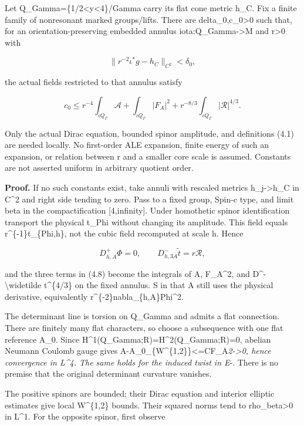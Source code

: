 \documentclass[
  10pt,
]{article}
\begin{document}
Let Q\_Gamma=\{1/2\textless\textbar y\textbar\textless4\}/Gamma carry
its flat cone metric h\_C. Fix a finite family of nonresonant marked
groups/lifts. There are delta\_0,c\_0\textgreater0 such that, for an
orientation-preserving embedded annulus iota:Q\_Gamma-\textgreater M and
r\textgreater0 with

\[
 \|r^{-2}\iota^*g-h_C\|_{C^2}<\delta_0,
\]

the actual fields restricted to that annulus satisfy

\[
 \boxed{c_0\le r^{-4}\int_{\iota Q_\Gamma}\mathcal A
          +\int_{\iota Q_\Gamma}|F_A|^2
          +r^{-8/3}\int_{\iota Q_\Gamma}|\mathcal R|^{4/3}.}       \tag{4.8}
\]

Only the actual Dirac equation, bounded spinor amplitude, and
definitions (4.1) are needed locally. No first-order ALE expansion,
finite energy of such an expansion, or relation between r and a smaller
core scale is assumed. Constants are not asserted uniform in arbitrary
quotient order.

\textbf{Proof.} If no such constants exist, take annuli with rescaled
metrics h\_j-\textgreater h\_C in C\^{}2 and right side tending to zero.
Pass to a fixed group, Spin-c type, and limit beta in the
compactification {[}4,infinity{]}. Under homothetic spinor
identification transport the physical t\_Phi without changing its
amplitude. This field equals r\^{}\{-1\}t\_\{Phi,h\}, not the cubic
field recomputed at scale h. Hence

\[
 D^+_{h,A}\Phi=0,\qquad
 D^-_{h,3A}\widetilde t=r\mathcal R,
\]

and the three terms in (4.8) become the integrals of A,
\textbar F\_A\textbar\^{}2, and \textbar D\^{}-\textbackslash widetilde
t\textbar\^{}\{4/3\} on the fixed annulus. S in that A still uses the
physical derivative, equivalently
r\^{}\{-2\}\textbar nabla\_\{h,A\}Phi\textbar\^{}2.

The determinant line is torsion on Q\_Gamma and admits a flat
connection. There are finitely many flat characters, so choose a
subsequence with one flat reference A\_0. Since
H\^{}1(Q\_Gamma;R)=H\^{}2(Q\_Gamma;R)=0, abelian Neumann Coulomb gauge
gives
\textbar\textbar A-A\_0\textbar\textbar\_\{W\^{}\{1,2\}\}\textless=C\textbar\textbar F\_A\textbar\textbar{}\emph{2-\textgreater0,
hence convergence in L\^{}4. The same holds for the induced twist in
E}-. There is no premise that the original determinant curvature
vanishes.

The positive spinors are bounded; their Dirac equation and interior
elliptic estimates give local W\^{}\{1,2\} bounds. Their squared norms
tend to rho\_beta\textgreater0 in L\^{}1. For the opposite spinor, first
observe
\end{document}
